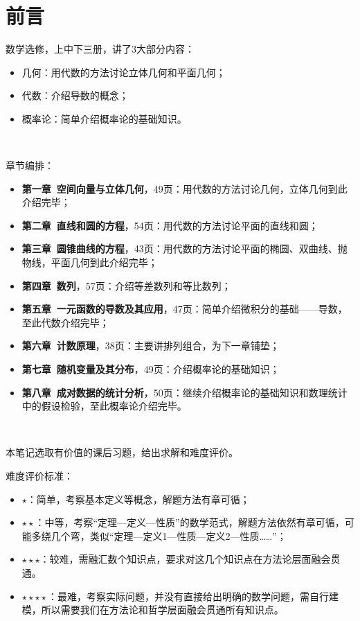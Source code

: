 \chapter{前言}

数学选修，上中下三册，讲了3大部分内容：
\begin{itemize}
    \item 几何：用代数的方法讨论立体几何和平面几何；
    \item 代数：介绍导数的概念；
    \item 概率论：简单介绍概率论的基础知识。
\end{itemize}

~

章节编排：
\begin{itemize}
    \item {\bf 第一章\ 空间向量与立体几何}，49页：用代数的方法讨论几何，立体几何到此介绍完毕；
    \item {\bf 第二章\ 直线和圆的方程}，54页：用代数的方法讨论平面的直线和圆；
    \item {\bf 第三章\ 圆锥曲线的方程}，43页：用代数的方法讨论平面的椭圆、双曲线、抛物线，平面几何到此介绍完毕；
    \item {\bf 第四章\ 数列}，57页：介绍等差数列和等比数列；
    \item {\bf 第五章\ 一元函数的导数及其应用}，47页：简单介绍微积分的基础——导数，至此代数介绍完毕；
    \item {\bf 第六章\ 计数原理}，38页：主要讲排列组合，为下一章铺垫；
    \item {\bf 第七章\ 随机变量及其分布}，49页：介绍概率论的基础知识；
    \item {\bf 第八章\ 成对数据的统计分析}，50页：继续介绍概率论的基础知识和数理统计中的假设检验，至此概率论介绍完毕。
\end{itemize}

~

本笔记选取有价值的课后习题，给出求解和难度评价。

难度评价标准：
\begin{itemize}
    \item $\star $：简单，考察基本定义等概念，解题方法有章可循；
    \item $\star \star $：中等，考察“定理—定义—性质”的数学范式，解题方法依然有章可循，可能多绕几个弯，类似“定理—定义1—性质—定义2—性质……”；
    \item $\star \star \star $：较难，需融汇数个知识点，要求对这几个知识点在方法论层面融会贯通。
    \item $\star \star \star \star $：最难，考察实际问题，并没有直接给出明确的数学问题，需自行建模，所以需要我们在方法论和哲学层面融会贯通所有知识点。
\end{itemize}





